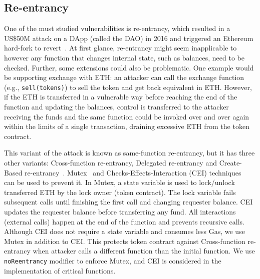 \subsection{Re-entrancy}
One of the must studied vulnerabilities is re-entrancy, which resulted in a US\$50M attack on a DApp (called the DAO) in 2016 and triggered an Ethereum hard-fork to revert~\cite{DAO1}. At first glance, re-entrancy might seem inapplicable to \erc however any function that changes internal state, such as balances, need to be checked. Further, some \erc extensions could also be problematic. One example would be supporting exchange with ETH: an attacker can call the exchange function (e.g., \texttt{sell(tokens)}) to sell the token and get back equivalent in ETH. However, if the ETH is transferred in a vulnerable way before reaching the end of the function and updating the balances, control is transferred to the attacker receiving the funds and the same function could be invoked over and over again within the limits of a single transaction, draining excessive ETH from the token contract.


This variant of the attack is known as same-function re-entrancy, but it has three other variants: Cross-function re-entrancy, Delegated re-entrancy and Create-Based re-entrancy~\cite{SEREUM}. Mutex~\cite{WiKiMutex} and Checks-Effects-Interaction (CEI) techniques~\cite{SolidtyDocSec} can be used to prevent it. In Mutex, a state variable is used to lock/unlock transferred ETH by the lock owner (\ie token contract). The lock variable fails subsequent calls until finishing the first call and changing requester balance. CEI updates the requester balance before transferring any fund. All interactions (\ie external calls) happen at the end of the function and prevents recursive calls. Although CEI does not require a state variable and consumes less Gas, we use Mutex in addition to CEI. This protects token contract against Cross-function re-entrancy when attacker calls a different function than the initial function. We use \texttt{noReentrancy} modifier to enforce Mutex, and CEI is considered in the implementation of critical functions.


